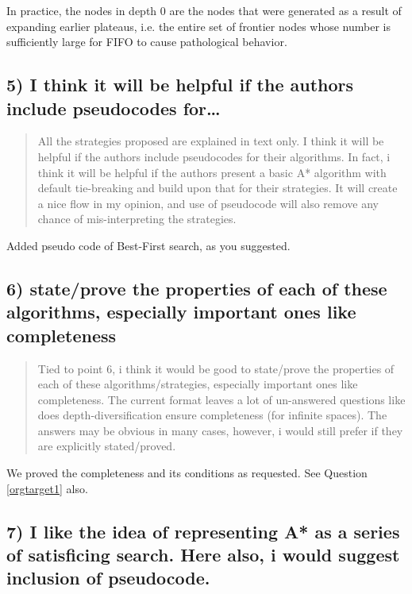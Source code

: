 \documentclass{article}
\begin{document}
In practice,
the nodes in depth 0 are the nodes that were generated as a result of expanding earlier plateaus,
i.e. the entire set of frontier nodes whose number is sufficiently large for FIFO
to cause pathological behavior.

\subsection{5) I think it will be helpful if the authors include pseudocodes for\ldots{}}
\label{sec:orgheadline19}

\begin{quote}
 All the strategies proposed are explained in text only. I think it
will be helpful if the authors include pseudocodes for their
algorithms. In fact, i think it will be helpful if the authors present
a basic A* algorithm with default tie-breaking and build upon that for
their strategies. It will create a nice flow in my opinion, and use of
pseudocode will also remove any chance of mis-interpreting the
strategies.
\end{quote}

Added pseudo code of Best-First search, as you suggested.

\subsection{6) state/prove the properties of each of these algorithms, especially important ones like completeness}
\label{sec:orgheadline20}

\begin{quote}
 Tied to point 6, i think it would be good to state/prove the
properties of each of these algorithms/strategies, especially
important ones like completeness. The current format leaves a lot of
un-answered questions like does depth-diversification ensure
completeness (for infinite spaces). The answers may be obvious in many
cases, however, i would still prefer if they are explicitly
stated/proved.
\end{quote}

We proved the completeness and its conditions as requested. See Question \ref{orgtarget1} also.

\subsection{7) I like the idea of representing A* as a series of satisficing search. Here also, i would suggest inclusion of pseudocode.}
\label{sec:orgheadline21}
\end{document}
